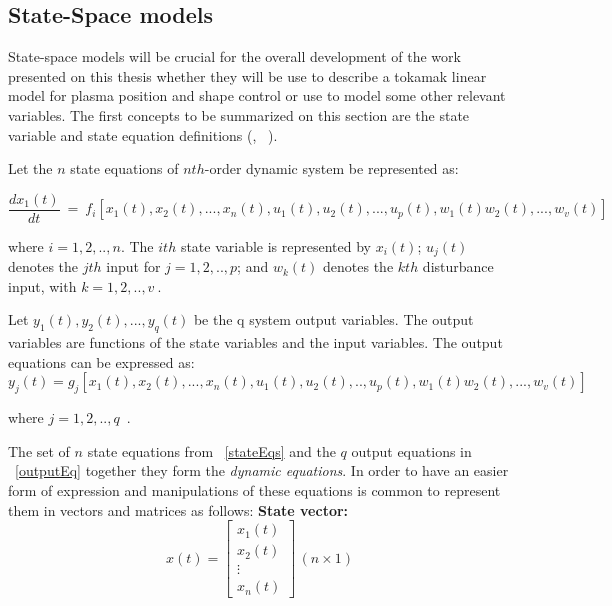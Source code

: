 \smallskip

\subsection{State-Space models}
\label{SS_subsec}
State-space models will be crucial for the overall development of the work presented on this thesis whether they will be use to describe a tokamak linear model for plasma position and  shape control or use to model some other relevant variables.  The first concepts  to be summarized on this section are the state variable and state equation definitions (\cite[Chapter~10]{Golnaraghi2010}, ~\cite[Chapter~2]{Kailath1980}).   \smallskip

Let the $n$ state equations of $nth$-order dynamic system be represented as:

\begin{equation}
	\frac{dx_1 (t)}{dt} ~ = ~ f_i [x_1(t),x_2(t),...,x_n(t), u_1(t),u_2(t),...,u_p(t),w_1(t)w_2(t),...,w_v(t)]
	\label{stateEqs}
\end{equation}

 where $i=1,2,..,n$. The $ith$ state variable is represented by $x_i(t)$; $u_j(t)$ denotes the $jth$ input for $j=1,2,..,p$; and $w_k(t)$ denotes the $kth$ disturbance input, with $k=1,2,..,v~$.\smallskip
 
 Let $y_1(t),y_2(t),...,y_q(t) $ be the q system output variables. The output variables are functions of the state variables  and the input variables. The output equations can be expressed as:
 \begin{equation}
 	y_j(t)=g_j[x_1(t),x_2(t),...,x_n(t),u_1(t),u_2(t),..,u_p(t),w_1(t)w_2(t),...,w_v(t)]
 \label{outputEq}
 \end{equation}
 
 where $j=1,2,..,q$~.
 \smallskip
 
 The set of $n$ state equations from ~\ref{stateEqs} and the $q$ output equations in ~\ref{outputEq} together they form the \textit{dynamic equations}. In order to have an easier form of expression and manipulations of these equations is common to represent them in vectors and matrices as follows: \smallskip
 \textbf{State vector:}
 \begin{equation}
 x(t)=
 \left[
 	\begin{matrix}
 	x_1(t)\\
 	x_2(t)\\
 	\vdots\\
 	x_n(t)
 	\end{matrix}
 	\right] \, (n\times 1)
 \end{equation}
 
